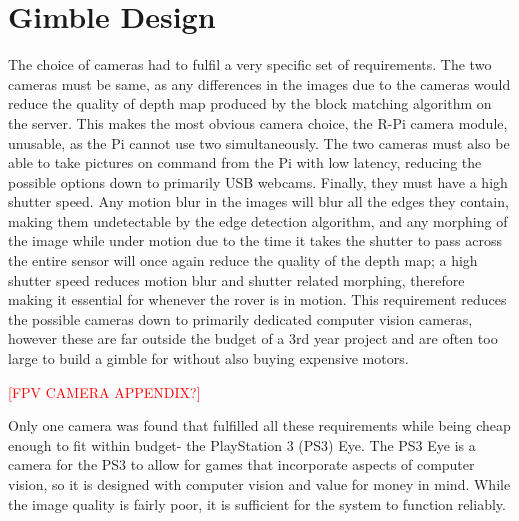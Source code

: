 \section{Gimble Design}

The choice of cameras had to fulfil a very specific set of requirements. The two cameras must be same, as any differences in the images due to the cameras would reduce the quality of depth map produced by the block matching algorithm on the server. This makes the most obvious camera choice, the R-Pi camera module, unusable, as the Pi cannot use two simultaneously. The two cameras must also be able to take pictures on command from the Pi with low latency, reducing the possible options down to primarily USB webcams. Finally, they must have a high shutter speed. Any motion blur in the images will blur all the edges they contain, making them undetectable by the edge detection algorithm, and any morphing of the image while under motion due to the time it takes the shutter to pass across the entire sensor will once again reduce the quality of the depth map; a high shutter speed reduces motion blur and shutter related morphing, therefore making it essential for whenever the rover is in motion. This requirement reduces the possible cameras down to primarily dedicated computer vision cameras, however these are far outside the budget of a 3rd year project and are often too large to build a gimble for without also buying expensive motors.

\textcolor{red}{[FPV CAMERA APPENDIX?]}

Only one camera was found that fulfilled all these requirements while being cheap enough to fit within budget- the PlayStation 3 (PS3) Eye. The PS3 Eye is a camera for the PS3 to allow for games that incorporate aspects of computer vision, so it is designed with computer vision and value for money in mind. While the image quality is fairly poor, it is sufficient for the system to function reliably. 

